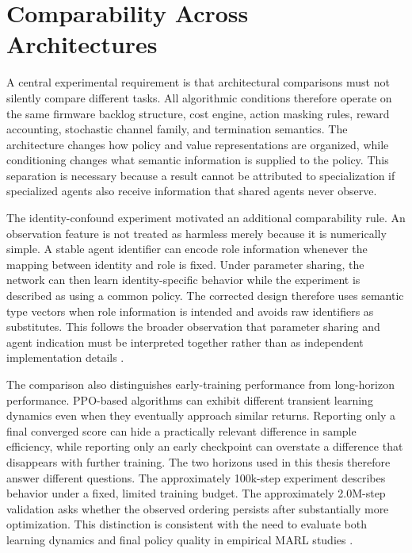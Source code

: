 \documentclass{iutbscthesis}
\begin{document}
\section{Comparability Across Architectures}
A central experimental requirement is that architectural comparisons must not silently compare different tasks. All algorithmic conditions therefore operate on the same firmware backlog structure, cost engine, action masking rules, reward accounting, stochastic channel family, and termination semantics. The architecture changes how policy and value representations are organized, while conditioning changes what semantic information is supplied to the policy. This separation is necessary because a result cannot be attributed to specialization if specialized agents also receive information that shared agents never observe.

The identity-confound experiment motivated an additional comparability rule. An observation feature is not treated as harmless merely because it is numerically simple. A stable agent identifier can encode role information whenever the mapping between identity and role is fixed. Under parameter sharing, the network can then learn identity-specific behavior while the experiment is described as using a common policy. The corrected design therefore uses semantic type vectors when role information is intended and avoids raw identifiers as substitutes. This follows the broader observation that parameter sharing and agent indication must be interpreted together rather than as independent implementation details \parencite{terry2020revisiting}.

The comparison also distinguishes early-training performance from long-horizon performance. PPO-based algorithms can exhibit different transient learning dynamics even when they eventually approach similar returns. Reporting only a final converged score can hide a practically relevant difference in sample efficiency, while reporting only an early checkpoint can overstate a difference that disappears with further training. The two horizons used in this thesis therefore answer different questions. The approximately 100k-step experiment describes behavior under a fixed, limited training budget. The approximately 2.0M-step validation asks whether the observed ordering persists after substantially more optimization. This distinction is consistent with the need to evaluate both learning dynamics and final policy quality in empirical MARL studies \parencite{yu2022surprising,raffin2021sb3}.
\end{document}
